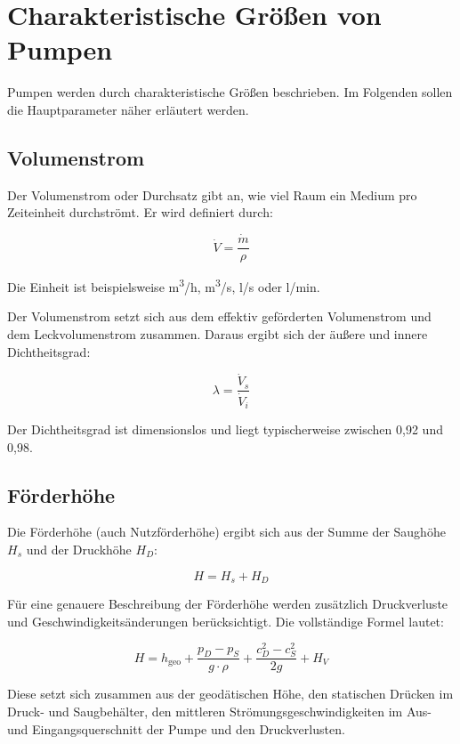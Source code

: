 \section{Charakteristische Größen von Pumpen}
Pumpen werden durch charakteristische Größen beschrieben. Im Folgenden sollen die Hauptparameter näher erläutert werden.

\subsection{Volumenstrom}
Der Volumenstrom oder Durchsatz gibt an, wie viel Raum ein Medium pro Zeiteinheit durchströmt. Er wird definiert durch:

\begin{equation}
	\dot{V} = \frac{\dot{m}}{\rho}
\end{equation}

Die Einheit ist beispielsweise \si{m^3/h}, \si{m^3/s}, \si{l/s} oder \si{l/min}.

Der Volumenstrom setzt sich aus dem effektiv geförderten Volumenstrom und dem Leckvolumenstrom zusammen. Daraus ergibt sich der äußere und innere Dichtheitsgrad:

\begin{equation}
	\lambda = \frac{\dot{V}_s}{\dot{V}_i}
\end{equation}

Der Dichtheitsgrad ist dimensionslos und liegt typischerweise zwischen 0{,}92 und 0{,}98.

\subsection{Förderhöhe}
Die Förderhöhe (auch Nutzförderhöhe) ergibt sich aus der Summe der Saughöhe \( H_s \) und der Druckhöhe \( H_D \):

\begin{equation}
	H = H_s + H_D
\end{equation}

Für eine genauere Beschreibung der Förderhöhe werden zusätzlich Druckverluste und Geschwindigkeitsänderungen berücksichtigt. Die vollständige Formel lautet:

\begin{equation}
	H = h_{\text{geo}} + \frac{p_D - p_S}{g \cdot \rho} + \frac{c_D^2 - c_S^2}{2g} + H_V
\end{equation}

Diese setzt sich zusammen aus der geodätischen Höhe, den statischen Drücken im Druck- und Saugbehälter, den mittleren Strömungsgeschwindigkeiten im Aus- und Eingangsquerschnitt der Pumpe und den Druckverlusten.

